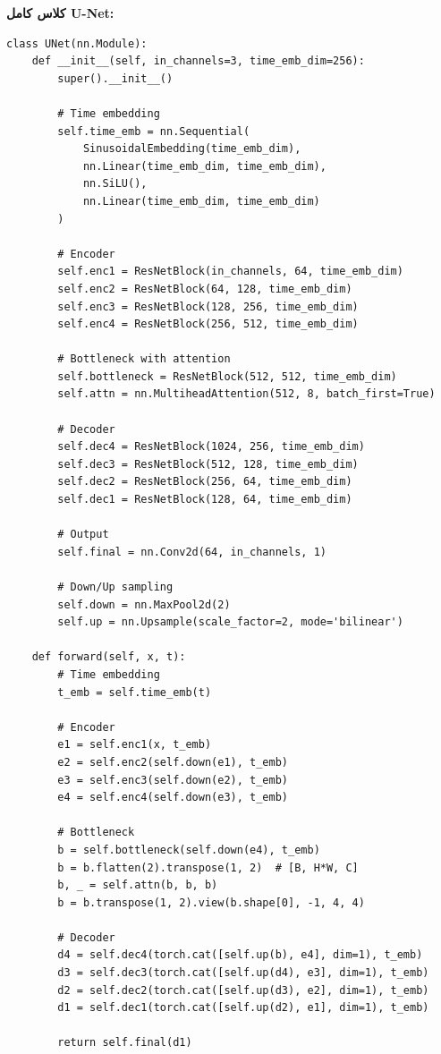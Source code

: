 \textbf{کلاس کامل U-Net:}
\begin{verbatim}
class UNet(nn.Module):
    def __init__(self, in_channels=3, time_emb_dim=256):
        super().__init__()
        
        # Time embedding
        self.time_emb = nn.Sequential(
            SinusoidalEmbedding(time_emb_dim),
            nn.Linear(time_emb_dim, time_emb_dim),
            nn.SiLU(),
            nn.Linear(time_emb_dim, time_emb_dim)
        )
        
        # Encoder
        self.enc1 = ResNetBlock(in_channels, 64, time_emb_dim)
        self.enc2 = ResNetBlock(64, 128, time_emb_dim)
        self.enc3 = ResNetBlock(128, 256, time_emb_dim)
        self.enc4 = ResNetBlock(256, 512, time_emb_dim)
        
        # Bottleneck with attention
        self.bottleneck = ResNetBlock(512, 512, time_emb_dim)
        self.attn = nn.MultiheadAttention(512, 8, batch_first=True)
        
        # Decoder
        self.dec4 = ResNetBlock(1024, 256, time_emb_dim)
        self.dec3 = ResNetBlock(512, 128, time_emb_dim)
        self.dec2 = ResNetBlock(256, 64, time_emb_dim)
        self.dec1 = ResNetBlock(128, 64, time_emb_dim)
        
        # Output
        self.final = nn.Conv2d(64, in_channels, 1)
        
        # Down/Up sampling
        self.down = nn.MaxPool2d(2)
        self.up = nn.Upsample(scale_factor=2, mode='bilinear')
    
    def forward(self, x, t):
        # Time embedding
        t_emb = self.time_emb(t)
        
        # Encoder
        e1 = self.enc1(x, t_emb)
        e2 = self.enc2(self.down(e1), t_emb)
        e3 = self.enc3(self.down(e2), t_emb)
        e4 = self.enc4(self.down(e3), t_emb)
        
        # Bottleneck
        b = self.bottleneck(self.down(e4), t_emb)
        b = b.flatten(2).transpose(1, 2)  # [B, H*W, C]
        b, _ = self.attn(b, b, b)
        b = b.transpose(1, 2).view(b.shape[0], -1, 4, 4)
        
        # Decoder
        d4 = self.dec4(torch.cat([self.up(b), e4], dim=1), t_emb)
        d3 = self.dec3(torch.cat([self.up(d4), e3], dim=1), t_emb)
        d2 = self.dec2(torch.cat([self.up(d3), e2], dim=1), t_emb)
        d1 = self.dec1(torch.cat([self.up(d2), e1], dim=1), t_emb)
        
        return self.final(d1)
\end{verbatim}

